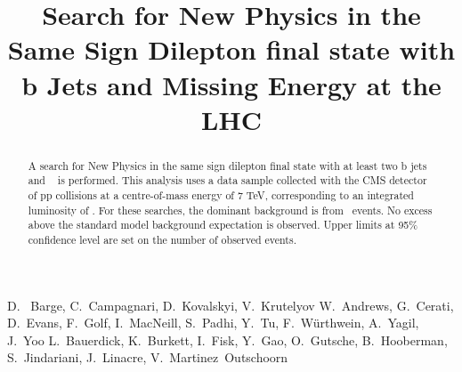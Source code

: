 \documentclass{cmspaper}
\begin{document}
%
\begin{titlepage}
\title{Search for New Physics in the Same Sign Dilepton final state with b Jets and Missing Energy at the LHC}

  \begin{Authlist}
    D.~ Barge, C.~Campagnari, D.~Kovalskyi, V.~Krutelyov
    W.~Andrews, G.~Cerati, D.~Evans, F.~Golf, I.~MacNeill, S.~Padhi, Y.~Tu, F.~W\"urthwein, A.~Yagil, J.~Yoo
    L.~Bauerdick, K.~Burkett, I.~Fisk, Y.~Gao, O.~Gutsche, B.~Hooberman, S.~Jindariani, J.~Linacre,
    V.~Martinez~Outschoorn
  \end{Authlist}

\begin{abstract}
A search for New Physics in the same sign dilepton final state with at least two b jets 
and \met~ is performed. 
This analysis uses a data sample collected with the CMS detector
of pp collisions at a centre-of-mass energy of 7 TeV, corresponding to an integrated
luminosity of \intLumi. 
For these searches, the dominant background is from \ttbar\ events. 
No excess above the standard model background expectation is observed.
Upper limits at 95\% confidence level are set on the number of observed events.
\end{abstract}
\end{titlepage}


%
%










\clearpage


\clearpage
\appendix

\end{document}

